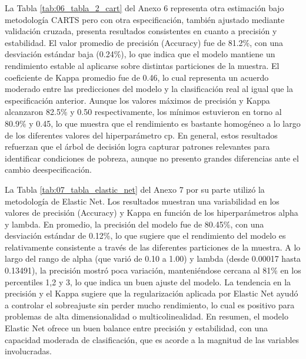 \documentclass[12pt,a4paper,onecolumn]{article}
\begin{document}
La Tabla \ref{tab:06_tabla_2_cart} del Anexo 6 representa otra estimación bajo metodología CARTS pero con otra especificación, también ajustado mediante validación cruzada, presenta resultados consistentes en cuanto a precisión y estabilidad. El valor promedio de precisión (Accuracy) fue de 81.2\%, con una desviación estándar baja (0.24\%), lo que indica que el modelo mantiene un rendimiento estable al aplicarse sobre distintas particiones de la muestra. El coeficiente de Kappa promedio fue de 0.46, lo cual representa un acuerdo moderado entre las predicciones del modelo y la clasificación real al igual que la especificación anterior. Aunque los valores máximos de precisión y Kappa alcanzaron 82.5\% y 0.50 respectivamente, los mínimos estuvieron en torno al 80.9\% y 0.45, lo que muestra que el rendimiento es bastante homogéneo a lo largo de los diferentes valores del hiperparámetro cp. En general, estos resultados refuerzan que el árbol de decisión logra capturar patrones relevantes para identificar condiciones de pobreza, aunque no presento grandes diferencias ante el cambio deespecificación.

La Tabla \ref{tab:07_tabla_elastic_net} del Anexo 7 por su parte utilizó la metodología de Elastic Net. Los resultados muestran una variabilidad en los valores de precisión (Accuracy) y Kappa en función de los hiperparámetros alpha y lambda. En promedio, la precisión del modelo fue de 80.45\%, con una desviación estándar de 0.12\%, lo que sugiere que el rendimiento del modelo es relativamente consistente a través de las diferentes particiones de la muestra. A lo largo del rango de alpha (que varió de 0.10 a 1.00) y lambda (desde 0.00017 hasta 0.13491), la precisión mostró poca variación, manteniéndose cercana al 81\% en los percentiles 1,2 y 3, lo que indica un buen ajuste del modelo. La tendencia en la precisión y el Kappa sugiere que la regularización aplicada por Elastic Net ayudó a controlar el sobreajuste sin perder mucho rendimiento, lo cual es positivo para problemas de alta dimensionalidad o multicolinealidad. En resumen, el modelo Elastic Net ofrece un buen balance entre precisión y estabilidad, con una capacidad moderada de clasificación, que es acorde a la magnitud de las variables involucradas.
\end{document}

